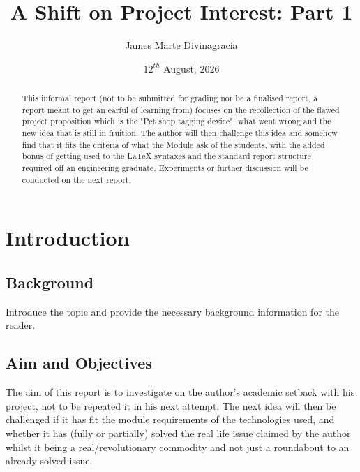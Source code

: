 \documentclass[12pt,a4paper]{report}
\title{\textbf{A Shift on Project Interest: Part 1}}
\author{James Marte Divinagracia}
\date{$12^{th}$ August, 2026}
\begin{document}
\maketitle

\begin{abstract}
This informal report (not to be submitted for grading nor be a finalised report, a report meant to get an earful of learning from) focuses on the recollection of the flawed project proposition which is the "Pet shop tagging device", what went wrong and the new idea that is still in fruition. The author will then challenge this idea and somehow find that it fits the criteria of what the Module ask of the students, with the added bonus of getting used to the LaTeX syntaxes and the standard report structure required off an engineering graduate. Experiments or further discussion will be conducted on the next report.
\end{abstract}

\tableofcontents
\newpage

\chapter{Introduction}

\section{Background}

Introduce the topic and provide the necessary background
information for the reader.

\section{Aim and Objectives}

The aim of this report is to investigate on the author's academic setback with his project, not to be repeated it in his next attempt. The next idea will then be challenged if it has fit the module requirements of the technologies used, and whether it has (fully or partially) solved the real life issue claimed by the author whilst it being a real/revolutionary commodity and not just a roundabout to an already solved issue. 
\end{document}
